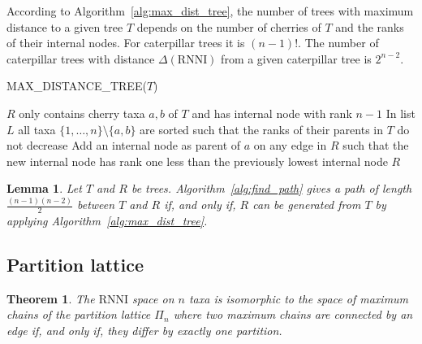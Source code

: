 \documentclass{amsart}
\newcommand{\rnni}{\mathrm{RNNI}}
\newtheorem{theorem}[definition]{Theorem}
\newtheorem{lemma}[definition]{Lemma}
\begin{document}
According to Algorithm~\ref{alg:max_dist_tree}, the number of trees with maximum distance to a given tree $T$ depends on the number of cherries of $T$ and the ranks of their internal nodes.
For caterpillar trees it is $(n-1)!$.
The number of caterpillar trees with distance $\Delta(\rnni)$ from a given caterpillar tree is $2^{n-2}$.

\begin{algorithm}[H]
\caption{MAX\_DISTANCE\_TREE($T$)}
\label{alg:max_dist_tree}
\begin{algorithmic}[1]
	\STATE $R$ only contains cherry taxa $a, b$ of $T$ and has internal node with rank $n-1$
    \STATE In list $L$ all taxa $\{1,\ldots,n\}\setminus\{a,b\}$ are sorted such that the ranks of their parents in $T$ do not decrease
		\STATE Add an internal node as parent of $a$ on any edge in $R$ such that the new internal node has rank one less than the previously lowest internal node
	\ENDFOR
	\RETURN $R$
\end{algorithmic}
\end{algorithm}

\begin{lemma}
    Let $T$ and $R$ be trees.
    Algorithm~\ref{alg:find_path} gives a path of length $\frac{(n-1)(n-2)}{2}$ between $T$ and $R$ if, and only if, $R$ can be generated from $T$ by applying Algorithm~\ref{alg:max_dist_tree}.
\end{lemma}



\subsection{Partition lattice}


\begin{theorem}
	The $\rnni$ space on $n$ taxa is isomorphic to the space of maximum chains of the partition lattice $\Pi_n$ where two maximum chains are connected by an edge if, and only if, they differ by exactly one partition.
\end{theorem}


\printbibliography
\end{document}
